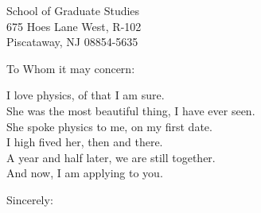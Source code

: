 \documentclass[
    jphafner,
    subject=left, %
    title=centering,
    backaddress=false,
]{scrlttr2}
\date{\today}
\begin{document}
\begin{letter}{%
School of Graduate Studies \\
675 Hoes Lane West, R-102 \\
Piscataway, NJ 08854-5635

}
\opening{To Whom it may concern:}

I love physics, of that I am sure. \\
She was the most beautiful thing, I have ever seen. \\
She spoke physics to me, on my first date. \\
I high fived her, then and there. \\
A year and half later, we are still together. \\
And now, I am applying to you.


\closing{Sincerely:}

\end{letter}
\end{document}

